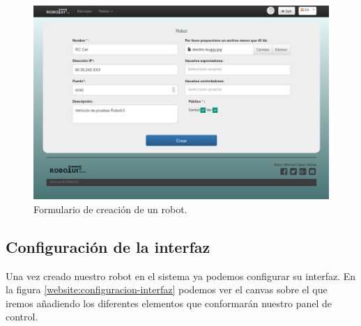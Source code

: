 \begin{figure}[H]
  \begin{center}
    \includegraphics[scale=0.3]{imagenes/manual-usuario/pagina-crear-robot.png}
  \end{center}
  \caption{Formulario de creación de un robot.}
  \label{website:creacion-robot}
\end{figure}



\subsection{Configuración de la interfaz}

Una vez creado nuestro robot en el sistema ya podemos configurar su interfaz. En la figura \ref{website:configuracion-interfaz} podemos ver el canvas sobre el que iremos añadiendo los diferentes elementos que 
conformarán nuestro panel de control.

